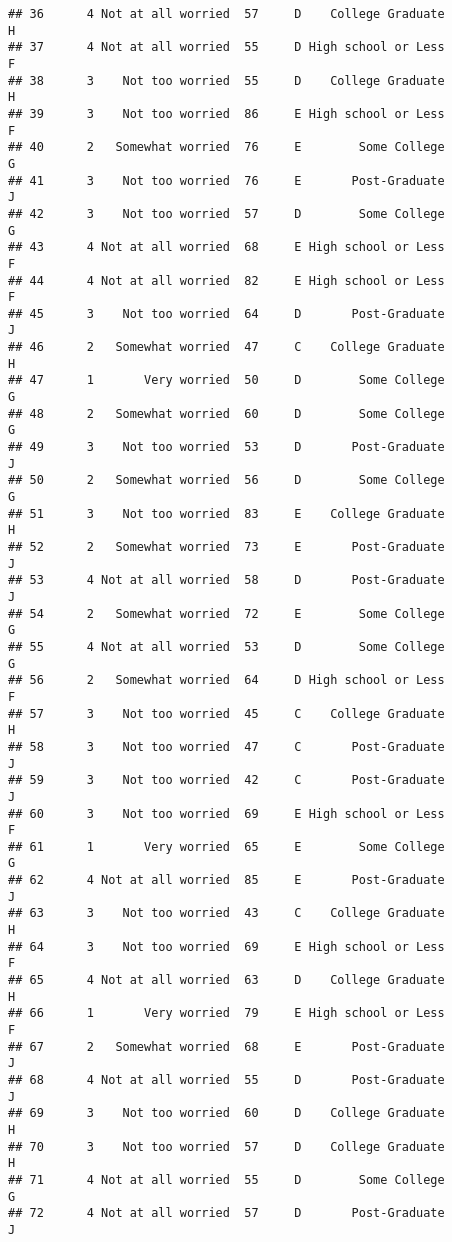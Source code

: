\documentclass[
]{article}
\begin{document}
\begin{verbatim}
## 36      4 Not at all worried  57     D    College Graduate         H
## 37      4 Not at all worried  55     D High school or Less         F
## 38      3    Not too worried  55     D    College Graduate         H
## 39      3    Not too worried  86     E High school or Less         F
## 40      2   Somewhat worried  76     E        Some College         G
## 41      3    Not too worried  76     E       Post-Graduate         J
## 42      3    Not too worried  57     D        Some College         G
## 43      4 Not at all worried  68     E High school or Less         F
## 44      4 Not at all worried  82     E High school or Less         F
## 45      3    Not too worried  64     D       Post-Graduate         J
## 46      2   Somewhat worried  47     C    College Graduate         H
## 47      1       Very worried  50     D        Some College         G
## 48      2   Somewhat worried  60     D        Some College         G
## 49      3    Not too worried  53     D       Post-Graduate         J
## 50      2   Somewhat worried  56     D        Some College         G
## 51      3    Not too worried  83     E    College Graduate         H
## 52      2   Somewhat worried  73     E       Post-Graduate         J
## 53      4 Not at all worried  58     D       Post-Graduate         J
## 54      2   Somewhat worried  72     E        Some College         G
## 55      4 Not at all worried  53     D        Some College         G
## 56      2   Somewhat worried  64     D High school or Less         F
## 57      3    Not too worried  45     C    College Graduate         H
## 58      3    Not too worried  47     C       Post-Graduate         J
## 59      3    Not too worried  42     C       Post-Graduate         J
## 60      3    Not too worried  69     E High school or Less         F
## 61      1       Very worried  65     E        Some College         G
## 62      4 Not at all worried  85     E       Post-Graduate         J
## 63      3    Not too worried  43     C    College Graduate         H
## 64      3    Not too worried  69     E High school or Less         F
## 65      4 Not at all worried  63     D    College Graduate         H
## 66      1       Very worried  79     E High school or Less         F
## 67      2   Somewhat worried  68     E       Post-Graduate         J
## 68      4 Not at all worried  55     D       Post-Graduate         J
## 69      3    Not too worried  60     D    College Graduate         H
## 70      3    Not too worried  57     D    College Graduate         H
## 71      4 Not at all worried  55     D        Some College         G
## 72      4 Not at all worried  57     D       Post-Graduate         J

\end{verbatim}
\end{document}
